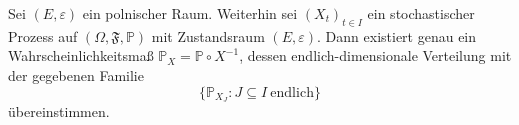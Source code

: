Sei $(E,\varepsilon)$ ein polnischer Raum. Weiterhin sei $(X_{t})_{t\in I}$ ein stochastischer Prozess auf $(\Omega, \mathfrak{F}, \mathbb{P})$ mit Zustandsraum $(E,\varepsilon)$. Dann existiert genau ein Wahrscheinlichkeitsmaß ${\mathbb{P}}_{X} = \mathbb{P} \circ {X}^{-1}$, dessen endlich-dimensionale Verteilung mit der gegebenen Familie 
\begin{equation*}
\lbrace \mathbb{P}_{X_{J}} : J \subseteq I \: \mathrm{endlich} \rbrace
\end{equation*} 
übereinstimmen.